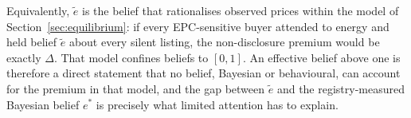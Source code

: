 Equivalently, $\tilde e$ is the belief that rationalises observed prices within the model of Section~\ref{sec:equilibrium}: if every EPC-sensitive buyer attended to energy and held belief $\tilde e$ about every silent listing, the non-disclosure premium would be exactly $\Delta$. That model confines beliefs to $[0,1]$. An effective belief above one is therefore a direct statement that no belief, Bayesian or behavioural, can account for the premium in that model, and the gap between $\tilde e$ and the registry-measured Bayesian belief $e^*$ is precisely what limited attention has to explain.
